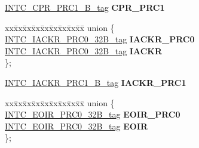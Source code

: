 \begin{DoxyCompactItemize}
\begin{tabbing}
\end{tabbing}\item 
\mbox{\label{structINTC__struct__tag_ad7ea532c4d64cedd8128f8e9a3641af5}} 
\mbox{\hyperlink{unionINTC__CPR__PRC1__32B__tag}{I\+N\+T\+C\+\_\+\+C\+P\+R\+\_\+\+P\+R\+C1\+\_\+B\+\_\+tag}} {\bfseries C\+P\+R\+\_\+\+P\+R\+C1}
\item 
\mbox{\label{structINTC__struct__tag_a24ce3135f983b868bc467d12eb8bb2ca}} 
\begin{tabbing}
xx\=xx\=xx\=xx\=xx\=xx\=xx\=xx\=xx\=\kill
union \{\\
\>\mbox{\hyperlink{unionINTC__IACKR__PRC0__32B__tag}{INTC\_IACKR\_PRC0\_32B\_tag}} {\bfseries IACKR\_PRC0}\\
\>\mbox{\hyperlink{unionINTC__IACKR__PRC0__32B__tag}{INTC\_IACKR\_PRC0\_32B\_tag}} {\bfseries IACKR}\\
\}; \\

\end{tabbing}\item 
\mbox{\label{structINTC__struct__tag_af29b73f552666c2d4e034cfd89cc9c2c}} 
\mbox{\hyperlink{unionINTC__IACKR__PRC1__32B__tag}{I\+N\+T\+C\+\_\+\+I\+A\+C\+K\+R\+\_\+\+P\+R\+C1\+\_\+B\+\_\+tag}} {\bfseries I\+A\+C\+K\+R\+\_\+\+P\+R\+C1}
\item 
\mbox{\label{structINTC__struct__tag_a0c154b90a526b857836bc3ddd4460dc6}} 
\begin{tabbing}
xx\=xx\=xx\=xx\=xx\=xx\=xx\=xx\=xx\=\kill
union \{\\
\>\mbox{\hyperlink{unionINTC__EOIR__PRC0__32B__tag}{INTC\_EOIR\_PRC0\_32B\_tag}} {\bfseries EOIR\_PRC0}\\
\>\mbox{\hyperlink{unionINTC__EOIR__PRC0__32B__tag}{INTC\_EOIR\_PRC0\_32B\_tag}} {\bfseries EOIR}\\
\}; \\


\end{tabbing}
\end{DoxyCompactItemize}
